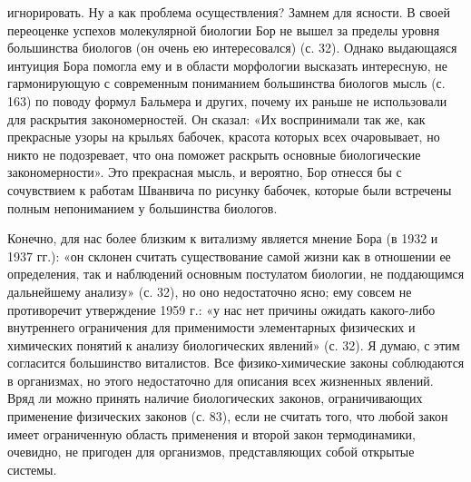 игнорировать. Ну а  как проблема осуществления? Замнем  для ясности. В
своей  переоценке  успехов  молекулярной  биологии  Бор  не  вышел  за
пределы  уровня  большинства  биологов  (он  очень  ею  интересовался)
(с.  32). Однако  выдающаяся интуиция  Бора  помогла ему  и в  области
морфологии  высказать  интересную,   не  гармонирующую  с  современным
пониманием  большинства  биологов  мысль  (с. 163)  по  поводу  формул
Бальмера  и других,  почему их  раньше не  использовали для  раскрытия
закономерностей. Он  сказал: «Их  воспринимали так же,  как прекрасные
узоры на крыльях  бабочек, красота которых всех  очаровывает, но никто
не  подозревает,  что  она  поможет  раскрыть  основные  биологические
закономерности». Это  прекрасная мысль, и  вероятно, Бор отнесся  бы с
сочувствием  к  работам  Шванвича  по рисунку  бабочек,  которые  были
встречены полным непониманием у большинства биологов.

Конечно, для  нас более  близким к витализму  является мнение  Бора (в
1932 и  1937 гг.): «он  склонен считать существование самой  жизни как
в  отношении  ее определения,  так  и  наблюдений основным  постулатом
биологии,  не  поддающимся  дальнейшему   анализу»  (с.  32),  но  оно
недостаточно ясно; ему совсем не  противоречит утверждение 1959 г.: «у
нас  нет  причины  ожидать  какого-либо  внутреннего  ограничения  для
применимости элементарных  физических и  химических понятий  к анализу
биологических явлений» (с. 32). Я думаю, с этим согласится большинство
виталистов. Все физико-химические законы  соблюдаются в организмах, но
этого  недостаточно  для  описания  всех жизненных  явлений.  Вряд  ли
можно принять наличие биологических законов, ограничивающих применение
физических  законов (с.  83), если  не считать  того, что  любой закон
имеет ограниченную  область применения  и второй  закон термодинамики,
очевидно, не  пригоден для  организмов, представляющих  собой открытые
системы.

